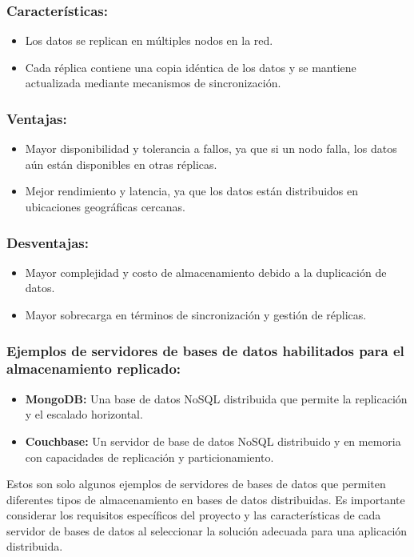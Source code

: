\subsubsection{Características:}
\noindent
\begin{itemize}
	\item Los datos se replican en múltiples nodos en la red.
	\item Cada réplica contiene una copia idéntica de los datos y se mantiene actualizada mediante mecanismos de sincronización.
\end{itemize}

\subsubsection{Ventajas:}
\noindent
\begin{itemize}
	\item Mayor disponibilidad y tolerancia a fallos, ya que si un nodo falla, los datos aún están disponibles en otras réplicas.
	\item Mejor rendimiento y latencia, ya que los datos están distribuidos en ubicaciones geográficas cercanas.
\end{itemize}

\subsubsection{Desventajas:}
\noindent
\begin{itemize}
	\item Mayor complejidad y costo de almacenamiento debido a la duplicación de datos.
	\item Mayor sobrecarga en términos de sincronización y gestión de réplicas.
\end{itemize}

\subsubsection{Ejemplos de servidores de bases de datos habilitados para el almacenamiento replicado:}
\noindent
\begin{itemize}
	\item \textbf{MongoDB:} Una base de datos NoSQL distribuida que permite la replicación y el escalado horizontal.
	\item \textbf{Couchbase:} Un servidor de base de datos NoSQL distribuido y en memoria con capacidades de replicación y particionamiento.
\end{itemize}
Estos son solo algunos ejemplos de servidores de bases de datos que permiten diferentes tipos de almacenamiento en bases de datos distribuidas. Es importante considerar los requisitos específicos del proyecto y las características de cada servidor de bases de datos al seleccionar la solución adecuada para una aplicación distribuida.

